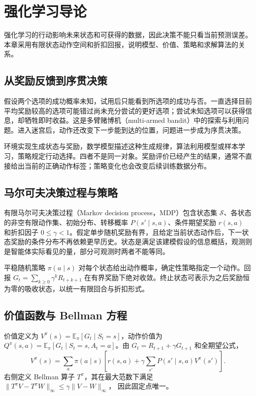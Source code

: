 \setcounter{chapter}{23} %
\chapter{强化学习导论}
\label{chap:ml-rl}

强化学习的行动影响未来状态和可获得的数据，因此决策不能只看当前预测误差。本章采用有限状态动作空间和折扣回报，说明模型、价值、策略和求解算法的关系。

\section{从奖励反馈到序贯决策}

假设两个选项的成功概率未知，试用后只能看到所选项的成功与否。一直选择目前平均奖励较高的选项可能错过尚未充分尝试的更好选项；尝试未知选项可以获得信息，却牺牲即时收益。这是多臂赌博机（multi-armed bandit）中的探索与利用问题。进入迷宫后，动作还改变下一步能到达的位置，问题进一步成为序贯决策。

环境实现生成状态与奖励，数学模型描述这种生成规律，算法利用模型或样本学习，策略规定行动选择。四者不是同一对象。奖励评价已经产生的结果，通常不直接给出当前的正确动作标签；策略变化也会改变后续训练数据分布。

\section{马尔可夫决策过程与策略}

有限马尔可夫决策过程（Markov decision process，MDP）包含状态集 $\mathcal S$、各状态的非空有限动作集、初始分布、转移概率 $P(s'\mid s,a)$、条件期望奖励 $r(s,a)$ 和折扣因子 $0\leq\gamma<1$。假定单步随机奖励有界，且给定当前状态动作后，下一状态奖励的条件分布不再依赖更早历史。状态是满足该建模假设的信息概括，观测则是智能体实际看见的量，部分可观测时两者不能等同。

平稳随机策略 $\pi(a\mid s)$ 对每个状态给出动作概率，确定性策略指定一个动作。回报 $G_t=\sum_{k\geq0}\gamma^kR_{t+k+1}$ 在有界奖励下绝对收敛。终止状态可表示为之后奖励恒为零的吸收状态，以统一有限回合与折扣形式。

\section{价值函数与 Bellman 方程}

价值定义为 $V^\pi(s)=\mathbb E_\pi[G_t\mid S_t=s]$，动作价值为 $Q^\pi(s,a)=\mathbb E_\pi[G_t\mid S_t=s,A_t=a]$。由 $G_t=R_{t+1}+\gamma G_{t+1}$ 和全期望公式，
\begin{equation}
 V^\pi(s)=\sum_a\pi(a\mid s)\left[r(s,a)+\gamma\sum_{s'}P(s'\mid s,a)V^\pi(s')\right].
 \label{eq:ml-bellman-expectation}
\end{equation}
右侧定义 Bellman 算子 $T^\pi$，其在最大范数下满足
$\|T^\pi V-T^\pi W\|_\infty\leq\gamma\|V-W\|_\infty$，
因此固定点唯一。


